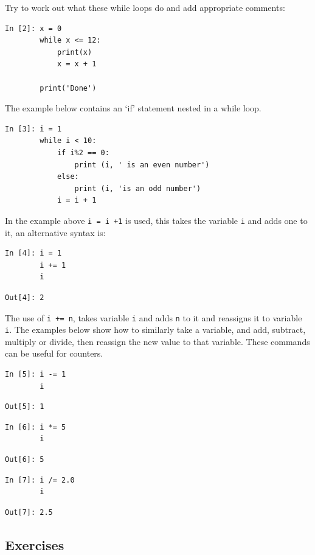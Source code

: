 \noindent Try to work out what these while loops do and add appropriate comments:
\begin{lstlisting}[style=PY]
In [2]: x = 0
        while x <= 12:
            print(x)
            x = x + 1

        print('Done')
\end{lstlisting}
\noindent The example below contains an `if' statement nested in a while loop.
\begin{lstlisting}[style=PY]
In [3]: i = 1
        while i < 10:
            if i%2 == 0:
                print (i, ' is an even number')
            else:
                print (i, 'is an odd number')
            i = i + 1
\end{lstlisting}

\noindent In the example above \texttt{i = i +1} is used, this takes the variable \texttt{i} and adds one to it, an alternative syntax is:

\begin{lstlisting}[style=PY]
In [4]: i = 1
        i += 1
        i
\end{lstlisting}
\begin{lstlisting}[style=PY_out]
Out[4]: 2
\end{lstlisting}

\noindent The use of \texttt{i += n}, takes variable \texttt{i} and adds \texttt{n} to it and reassigns it to variable \texttt{i}. The examples below show how to similarly take a variable, and add, subtract, multiply or divide, then reassign the new value to that variable. These commands can be useful for counters.

 
\begin{lstlisting}[style=PY]
In [5]: i -= 1
        i
\end{lstlisting}
\begin{lstlisting}[style=PY_out]
Out[5]: 1
\end{lstlisting}
\begin{lstlisting}[style=PY]
In [6]: i *= 5
        i
\end{lstlisting}
\begin{lstlisting}[style=PY_out]
Out[6]: 5
\end{lstlisting}
\begin{lstlisting}[style=PY]
In [7]: i /= 2.0
        i
\end{lstlisting}
\begin{lstlisting}[style=PY_out]
Out[7]: 2.5
\end{lstlisting}


\subsection{Exercises}

